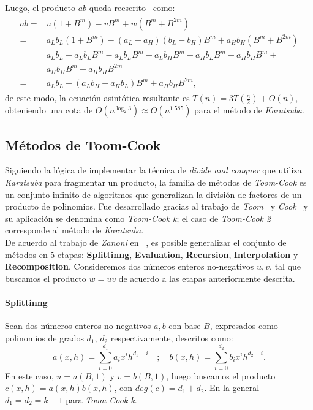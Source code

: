 Luego, el producto $ab$ queda reescrito~\cite{luders2015fast} como:
\begin{align}
\begin{split}
    ab=& u\left(1+B^{m}\right)-v B^{m}+w\left(B^{m}+B^{2m}\right) \\
    =& a_{L} b_{L}\left(1+B^{m}\right)-\left(a_{L}-a_{H}\right)\left(b_{L}-b_{H}\right) B^{m}+a_{H} b_{H}\left(B^{m}+B^{2m}\right) \\
    =& a_{L} b_{L}+a_{L} b_{L} B^{m}-a_{L} b_{L} B^{m}+a_{L} b_{H} B^{m}+a_{H} b_{L} B^{m}-a_{H} b_{H} B^{m}+\\
& a_{H} b_{H} B^{m}+a_{H} b_{H} B^{2m} \\
    =& a_{L} b_{L}+\left(a_{L} b_{H}+a_{H} b_{L}\right) B^{m}+a_{H} b_{H} B^{2 m},
\end{split}\label{divkar::4}
\end{align}
de este modo, la ecuación asintótica resultante es $T(n)=3T(\frac{n}{2}) + O(n)$, obteniendo una cota de $O(n^{\log_{2}{3}})\approx O(n^{1.585})$ para el método de \textit{Karatsuba}.

\subsection{Métodos de Toom-Cook}

Siguiendo la lógica de implementar la técnica de \textit{divide and conquer} que utiliza \textit{Karatsuba} para fragmentar un producto, la familia de métodos de \textit{Toom-Cook} es un conjunto infinito de algoritmos que generalizan la división de factores de un producto de polinomios. Fue desarrollado gracias al trabajo de \textit{Toom}~\cite{Toom1963TheCO} y \textit{Cook}~\cite{10.2307/1995359} y su aplicación se denomina como \textit{Toom-Cook k}; el caso de \textit{Toom-Cook 2} corresponde al método de \textit{Karatsuba}.\\

De acuerdo al trabajo de \textit{Zanoni} en ~\cite{10.1145/1837934.1837995}, es posible generalizar el conjunto de métodos en 5 etapas: \textbf{Splittinng}, \textbf{Evaluation}, \textbf{Recursion}, \textbf{Interpolation} y \textbf{Recomposition}.
Consideremos dos números enteros no-negativos $u,v$, tal que buscamos el producto $w=uv$ de acuerdo a las etapas anteriormente descrita.

\paragraph{Splittinng}
Sean dos números enteros no-negativos $a,b$ con base $B$, expresados como polinomios de grados $d_{1}$, $d_{2}$ respectivamente, descritos como:
\begin{equation}
    a(x,h)=\sum^{d_{1}}_{i=0}{a_{i}x^{i}h^{d_{1}-i}} \quad ; \quad b(x,h)=\sum^{d_{2}}_{i=0}{b_{i}x^{i}h^{d_{2}-i}}.
\end{equation}
En este caso, $u=a(B,1)$ y $v=b(B,1)$, luego buscamos el producto $c(x,h)=a(x,h)b(x,h)$, con $deg(c)=d_{1}+d_{2}$. En la general $d_{1}=d_{2}=k-1$ para \textit{Toom-Cook k}.


